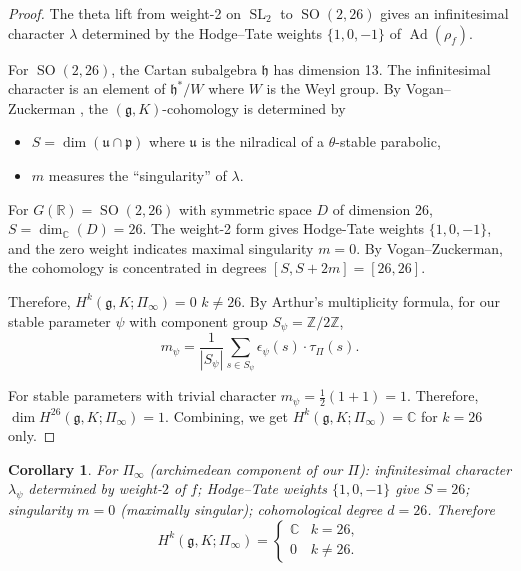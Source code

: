 \documentclass[12pt]{amsart}
\newtheorem{corollary}[theorem]{Corollary}
\theoremstyle{definition}
\DeclareMathOperator\SO{SO}
\DeclareMathOperator\SL{SL}
\DeclareMathOperator\Ad{Ad}
\newcommand{\R}{\mathbb{R}}
\newcommand{\C}{\mathbb{C}}
\newcommand{\Z}{\mathbb{Z}}
\begin{document}
\begin{proof}

The theta lift from weight-2 on $\SL_2$ to $\SO(2,26)$ gives an infinitesimal character $\lambda$ determined by the Hodge--Tate weights $\{1, 0, -1\}$ of $\Ad(\rho_f)$.

For $\SO(2,26)$, the Cartan subalgebra $\mathfrak{h}$ has dimension 13. The infinitesimal character is an element of $\mathfrak{h}^*/W$ where $W$ is the Weyl group. By Vogan--Zuckerman \cite{Vogan-Zuckerman}, the $({\mathfrak g},K)$-cohomology is determined by
\begin{itemize}
\item $S = \dim(\mathfrak{u} \cap \mathfrak{p})$ where $\mathfrak{u}$ is the nilradical of a $\theta$-stable parabolic,
\item $m$ measures the ``singularity'' of $\lambda.$
\end{itemize}

For $G(\R) = \SO(2,26)$ with symmetric space ${D}$ of dimension 26, 
$S = \dim_{\C}({D}) = 26.$ The weight-2 form gives Hodge-Tate weights $\{1,0,-1\}$, and the zero weight indicates maximal singularity
$m = 0.$ By Vogan--Zuckerman, the cohomology is concentrated in degrees $[S, S + 2m] = [26, 26].$

Therefore, $H^k(\mathfrak g, K; \Pi_\infty) = 0$  $k \neq 26.$ By Arthur's multiplicity formula, for our stable parameter $\psi$ with component group $S_\psi = \Z/2\Z$,
$$m_\psi = \frac{1}{|S_\psi|} \sum_{s \in S_\psi} \epsilon_\psi(s) \cdot \tau_{\Pi}(s).$$

For stable parameters with trivial character
$m_\psi = \frac{1}{2}(1 + 1) = 1.$ Therefore,
$\dim H^{26}({\mathfrak g}, K; \Pi_\infty) = 1.$ Combining, we get $H^k({\mathfrak g}, K; \Pi_\infty) = \C$ for $k=26$ only. \end{proof}




\begin{corollary} 
For $\Pi_{\infty}$ (archimedean component of our $\Pi$): infinitesimal character $\lambda_{\psi}$ determined by weight-$2$ of $f$; Hodge--Tate weights $\{1, 0, -1\}$ give $S = 26$; singularity $m = 0$ (maximally singular); cohomological degree $d = 26$. Therefore
\[
H^k({\mathfrak g}, K; \Pi_{\infty}) = \begin{cases} \C & k = 26, \\ 0 & k \neq 26. \end{cases}
\]
\end{corollary}
 
\end{document}
